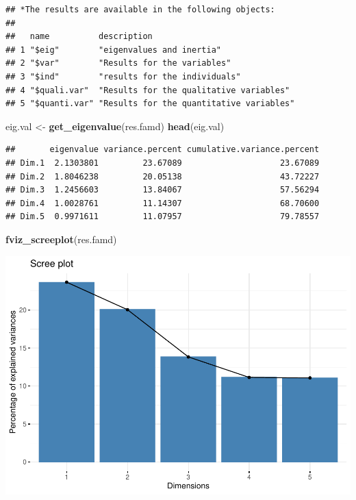 \documentclass[
]{article}
\newenvironment{Shaded}{\begin{snugshade}}{\end{snugshade}}
\newcommand{\KeywordTok}[1]{\textcolor[rgb]{0.13,0.29,0.53}{\textbf{#1}}}
\newcommand{\NormalTok}[1]{#1}
\newcommand{\StringTok}[1]{\textcolor[rgb]{0.31,0.60,0.02}{#1}}
\begin{document}
\begin{verbatim}
## *The results are available in the following objects:
## 
##   name          description                             
## 1 "$eig"        "eigenvalues and inertia"               
## 2 "$var"        "Results for the variables"             
## 3 "$ind"        "results for the individuals"           
## 4 "$quali.var"  "Results for the qualitative variables" 
## 5 "$quanti.var" "Results for the quantitative variables"
\end{verbatim}

\begin{Shaded}
\begin{Highlighting}[]
\NormalTok{eig.val <-}\StringTok{ }\KeywordTok{get_eigenvalue}\NormalTok{(res.famd)}
\KeywordTok{head}\NormalTok{(eig.val)}
\end{Highlighting}
\end{Shaded}

\begin{verbatim}
##       eigenvalue variance.percent cumulative.variance.percent
## Dim.1  2.1303801         23.67089                    23.67089
## Dim.2  1.8046238         20.05138                    43.72227
## Dim.3  1.2456603         13.84067                    57.56294
## Dim.4  1.0028761         11.14307                    68.70600
## Dim.5  0.9971611         11.07957                    79.78557
\end{verbatim}

\begin{Shaded}
\begin{Highlighting}[]
\KeywordTok{fviz_screeplot}\NormalTok{(res.famd)}
\end{Highlighting}
\end{Shaded}

\includegraphics{project-code_files/figure-latex/unnamed-chunk-32-1.pdf}
\end{document}
